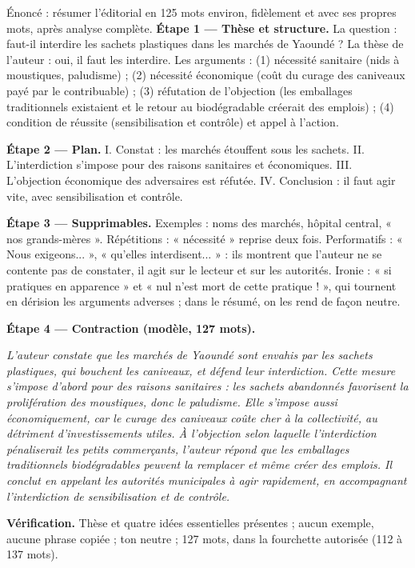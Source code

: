 \documentclass[11pt]{article}
\begin{document}
\begin{exoresolu}
Énoncé : résumer l'éditorial en 125 mots environ, fidèlement et avec ses propres mots, après analyse complète.
\tcblower
\textbf{Étape 1 — Thèse et structure.} La question : faut-il interdire les sachets plastiques dans les marchés de Yaoundé ? La thèse de l'auteur : oui, il faut les interdire. Les arguments : (1) nécessité sanitaire (nids à moustiques, paludisme) ; (2) nécessité économique (coût du curage des caniveaux payé par le contribuable) ; (3) réfutation de l'objection (les emballages traditionnels existaient et le retour au biodégradable créerait des emplois) ; (4) condition de réussite (sensibilisation et contrôle) et appel à l'action.

\textbf{Étape 2 — Plan.} I. Constat : les marchés étouffent sous les sachets. II. L'interdiction s'impose pour des raisons sanitaires et économiques. III. L'objection économique des adversaires est réfutée. IV. Conclusion : il faut agir vite, avec sensibilisation et contrôle.

\textbf{Étape 3 — Supprimables.} Exemples : noms des marchés, hôpital central, « nos grands-mères ». Répétitions : « nécessité » reprise deux fois. Performatifs : « Nous exigeons... », « qu'elles interdisent... » : ils montrent que l'auteur ne se contente pas de constater, il agit sur le lecteur et sur les autorités. Ironie : « si pratiques en apparence » et « nul n'est mort de cette pratique ! », qui tournent en dérision les arguments adverses ; dans le résumé, on les rend de façon neutre.

\textbf{Étape 4 — Contraction (modèle, 127 mots).}

\emph{L'auteur constate que les marchés de Yaoundé sont envahis par les sachets plastiques, qui bouchent les caniveaux, et défend leur interdiction. Cette mesure s'impose d'abord pour des raisons sanitaires : les sachets abandonnés favorisent la prolifération des moustiques, donc le paludisme. Elle s'impose aussi économiquement, car le curage des caniveaux coûte cher à la collectivité, au détriment d'investissements utiles. À l'objection selon laquelle l'interdiction pénaliserait les petits commerçants, l'auteur répond que les emballages traditionnels biodégradables peuvent la remplacer et même créer des emplois. Il conclut en appelant les autorités municipales à agir rapidement, en accompagnant l'interdiction de sensibilisation et de contrôle.}

\textbf{Vérification.} Thèse et quatre idées essentielles présentes ; aucun exemple, aucune phrase copiée ; ton neutre ; 127 mots, dans la fourchette autorisée (112 à 137 mots).
\end{exoresolu}
\end{document}
